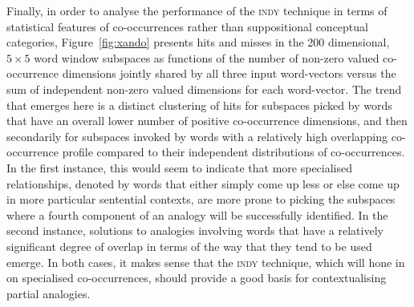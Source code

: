 Finally, in order to analyse the performance of the \textsc{indy} technique in terms of statistical features of co-occurrences rather than suppositional conceptual categories, Figure~\ref{fig:xando} presents hits and misses in the 200 dimensional, $5 \times 5$ word window subspaces as functions of the number of non-zero valued co-occurrence dimensions jointly shared by all three input word-vectors versus the sum of independent non-zero valued dimensions for each word-vector.  The trend that emerges here is a distinct clustering of hits for subspaces picked by words that have an overall lower number of positive co-occurrence dimensions, and then secondarily for subspaces invoked by words with a relatively high overlapping co-occurrence profile compared to their independent distributions of co-occurrences.  In the first instance, this would seem to indicate that more specialised relationships, denoted by words that either simply come up less or else come up in more particular sentential contexts, are more prone to picking the subspaces where a fourth component of an analogy will be successfully identified.  In the second instance, solutions to analogies involving words that have a relatively significant degree of overlap in terms of the way that they tend to be used emerge.  In both cases, it makes sense that the \textsc{indy} technique, which will hone in on specialised co-occurrences, should provide a good basis for contextualising partial analogies.

